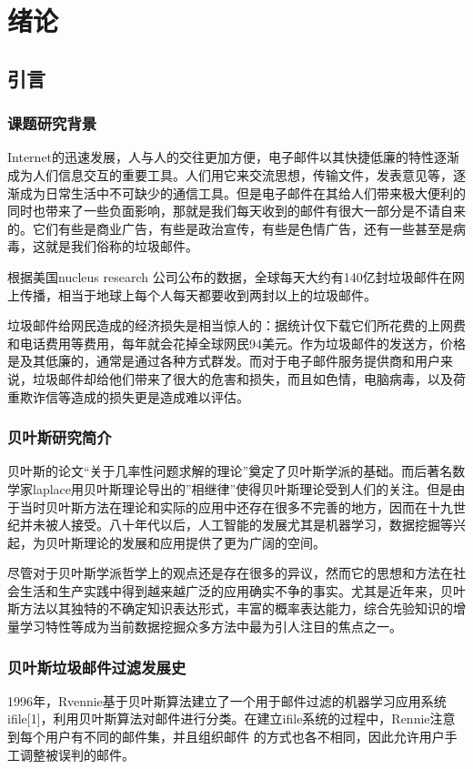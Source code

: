 \chapter{绪论}

\section{引言}

\subsection{课题研究背景}
Internet的迅速发展，人与人的交往更加方便，电子邮件以其快捷低廉的特性逐渐成为人们信息交互的重要工具。人们用它来交流思想，传输文件，发表意见等，逐渐成为日常生活中不可缺少的通信工具。但是电子邮件在其给人们带来极大便利的同时也带来了一些负面影响，那就是我们每天收到的邮件有很大一部分是不请自来的。它们有些是商业广告，有些是政治宣传，有些是色情广告，还有一些甚至是病毒，这就是我们俗称的垃圾邮件。

根据美国nucleus  research 公司公布的数据，全球每天大约有140亿封垃圾邮件在网上传播，相当于地球上每个人每天都要收到两封以上的垃圾邮件。  

垃圾邮件给网民造成的经济损失是相当惊人的：据统计仅下载它们所花费的上网费和电话费用等费用，每年就会花掉全球网民94美元。作为垃圾邮件的发送方，价格是及其低廉的，通常是通过各种方式群发。而对于电子邮件服务提供商和用户来说，垃圾邮件却给他们带来了很大的危害和损失，而且如色情，电脑病毒，以及荷重欺诈信等造成的损失更是造成难以评估。
\subsection{贝叶斯研究简介}
贝叶斯的论文“关于几率性问题求解的理论”奠定了贝叶斯学派的基础。而后著名数学家laplace用贝叶斯理论导出的”相继律”使得贝叶斯理论受到人们的关注。但是由于当时贝叶斯方法在理论和实际的应用中还存在很多不完善的地方，因而在十九世纪并未被人接受。八十年代以后，人工智能的发展尤其是机器学习，数据挖掘等兴起，为贝叶斯理论的发展和应用提供了更为广阔的空间。 

 尽管对于贝叶斯学派哲学上的观点还是存在很多的异议，然而它的思想和方法在社会生活和生产实践中得到越来越广泛的应用确实不争的事实。尤其是近年来，贝叶斯方法以其独特的不确定知识表达形式，丰富的概率表达能力，综合先验知识的增量学习特性等成为当前数据挖掘众多方法中最为引人注目的焦点之一。
\subsection{贝叶斯垃圾邮件过滤发展史}
 1996年，Rvennie基于贝叶斯算法建立了一个用于邮件过滤的机器学习应用系统 ifile[1]，利用贝叶斯算法对邮件进行分类。在建立ifile系统的过程中，Rennie注意到每个用户有不同的邮件集，并且组织邮件 的方式也各不相同，因此允许用户手工调整被误判的邮件。   
 
